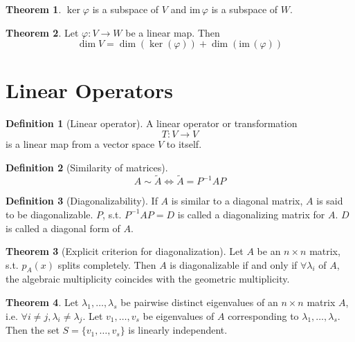 \documentclass[fleqn, a5paper, 10pt]{amsart}
\theoremstyle{definition}
\newtheorem{definition}{Definition} %
\theoremstyle{theorem}
\newtheorem{theorem}{Theorem} %
\theoremstyle{remark}
\newcommand{\im}{\mathrm{im}\,}
\numberwithin{corollary}{theorem}
\numberwithin{equation}{theorem}
\begin{document}
\begin{theorem}
	$\ker \varphi$ is a subspace of $V$ and $\im \varphi$ is a subspace of $W$.
\end{theorem}

\begin{theorem}
	Let $\varphi : V \to W$ be a linear map. Then
	\begin{equation*}
		\dim V = \dim (\ker (\varphi)) + \dim (\im (\varphi))
	\end{equation*}
\end{theorem}

\section{Linear Operators}

\begin{definition}[Linear operator]
	A linear operator or transformation
	\begin{equation*}
		T : V \to V
	\end{equation*}
	is a linear map from a vector space $V$ to itself.
\end{definition}

\begin{definition}[Similarity of matrices]
	\begin{equation*}
		A \sim \widetilde{A} \iff \widetilde{A} = P^{-1} A P
	\end{equation*}
\end{definition}

\begin{definition}[Diagonalizability]
	If $A$ is similar to a diagonal matrix, $A$ is said to be diagonalizable. $P$, s.t. $P^{-1} A P = D$ is called a diagonalizing matrix for $A$. $D$ is called a diagonal form of $A$.
\end{definition}

\begin{theorem}[Explicit criterion for diagonalization]
	Let $A$ be an $n \times n$ matrix, s.t. $p_A (x)$ splits completely. Then $A$ is diagonalizable if and only if $\forall \lambda_i$ of $A$, the algebraic multiplicity coincides with the geometric multiplicity.
\end{theorem}

\begin{theorem}
	Let $\lambda_1, \dots, \lambda_s$ be pairwise distinct eigenvalues of an $n \times n$ matrix $A$, i.e. $\forall i \neq j, \lambda_i \neq \lambda_j$. Let $v_1, \dots, v_s$ be eigenvalues of $A$ corresponding to $\lambda_1, \dots, \lambda_s$. Then the set $S = \{v_1, \dots, v_s\}$ is linearly independent.
\end{theorem}
\end{document}
